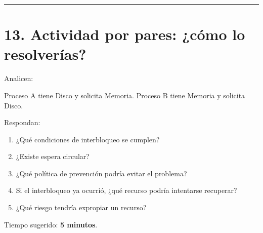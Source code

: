 \documentclass[
  spanish,
  letterpaper,
]{scrbook}
\newenvironment{Shaded}{\begin{snugshade}}{\end{snugshade}}
\newcommand{\NormalTok}[1]{\textcolor[rgb]{0.00,0.23,0.31}{#1}}
\providecommand{\tightlist}{%
  \setlength{\itemsep}{0pt}\setlength{\parskip}{0pt}}
\begin{document}
\begin{center}\rule{0.5\linewidth}{0.5pt}\end{center}


\chapter{13. Actividad por pares: ¿cómo lo
resolverías?}\label{actividad-por-pares-cuxf3mo-lo-resolveruxedas}

Analicen:

\begin{Shaded}
\begin{Highlighting}[]
\NormalTok{Proceso A tiene Disco y solicita Memoria.}
\NormalTok{Proceso B tiene Memoria y solicita Disco.}
\end{Highlighting}
\end{Shaded}

Respondan:

\begin{enumerate}
\def\labelenumi{\arabic{enumi}.}
\tightlist
\item
  ¿Qué condiciones de interbloqueo se cumplen?
\item
  ¿Existe espera circular?
\item
  ¿Qué política de prevención podría evitar el problema?
\item
  Si el interbloqueo ya ocurrió, ¿qué recurso podría intentarse
  recuperar?
\item
  ¿Qué riesgo tendría expropiar un recurso?
\end{enumerate}

Tiempo sugerido: \textbf{5 minutos}.
\end{document}
